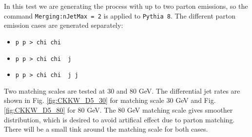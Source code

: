 In this test we are generating the process with up to two parton emissions, so the command \texttt{Merging:nJetMax = 2} is applied to \texttt{Pythia 8}. The different parton emission cases are generated separately:
\begin{itemize}
\item \texttt{p p > chi chi~}
\item \texttt{p p > chi chi~ j}
\item \texttt{p p > chi chi~ j j}
\end{itemize}
Two matching scales are tested at 30 and 80 GeV. The differential jet rates are shown in Fig. \ref{fig:CKKW_D5_30} for matching scale 30 GeV and Fig. \ref{fig:CKKW_D5_80} for 80 GeV. The 80 GeV matching scale gives smoother distribution, which is desired to avoid artifical effect due to parton matching. There will be a small tink around the matching scale for both cases.

